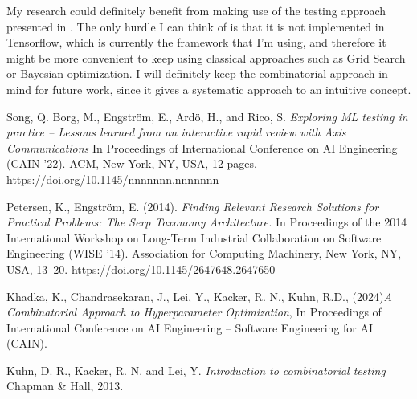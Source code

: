 \documentclass{article}
\begin{document}
My research could definitely benefit from making use of the testing approach presented in \cite{khadka_2024}. The only hurdle I can think of is that it is not implemented in Tensorflow, which is currently the framework that I'm using, and therefore it might be more convenient to keep using classical approaches such as Grid Search or Bayesian optimization. I will definitely keep the combinatorial approach in mind for future work, since it gives a systematic approach to an intuitive concept.



\begin{thebibliography}{9}

Song, Q. Borg, M., Engström, E., Ardö, H., and Rico, S.
\emph{Exploring ML testing in practice – Lessons learned from an
interactive rapid review with Axis Communications}
In Proceedings of International
Conference on AI Engineering (CAIN ’22). ACM, New York, NY, USA, 12 pages.
https://doi.org/10.1145/nnnnnnn.nnnnnnn

Petersen, K., Engström, E. (2014). \emph{Finding Relevant Research Solutions
for Practical Problems: The Serp Taxonomy Architecture.} In Proceedings of the
2014 International Workshop on Long-Term Industrial Collaboration on Software
Engineering (WISE ’14). Association for Computing Machinery, New York, NY,
USA, 13–20. https://doi.org/10.1145/2647648.2647650



Khadka, K., Chandrasekaran, J., Lei, Y., Kacker, R. N., Kuhn, R.D., (2024)\emph{A Combinatorial Approach to Hyperparameter Optimization},
In Proceedings of International Conference on AI Engineering – Software Engineering for AI (CAIN). 


Kuhn, D. R., Kacker, R. N. and Lei, Y. \emph{Introduction to combinatorial testing}
Chapman \& Hall, 2013.
\end{thebibliography}
 
\end{document}
